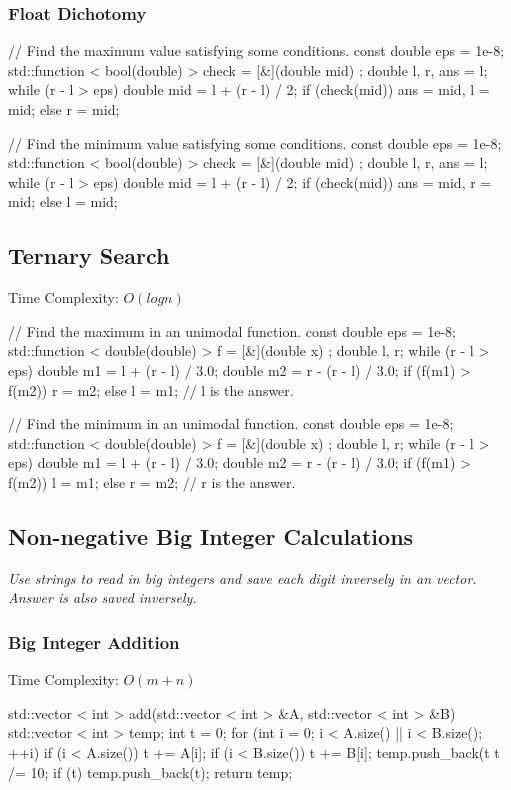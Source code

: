 \subsubsection{Float Dichotomy}
\begin{cppcode}
// Find the maximum value satisfying some conditions.
const double eps = 1e-8;
std::function < bool(double) > check = [&](double mid) {};
double l, r, ans = l;
while (r - l > eps)
{
    double mid = l + (r - l) / 2;
    if (check(mid)) ans = mid, l = mid;
    else r = mid;
}
\end{cppcode}
\begin{cppcode}
// Find the minimum value satisfying some conditions.
const double eps = 1e-8;
std::function < bool(double) > check = [&](double mid) {};
double l, r, ans = l;
while (r - l > eps)
{
    double mid = l + (r - l) / 2;
    if (check(mid)) ans = mid, r = mid;
    else l = mid;
}
\end{cppcode}

\subsection{Ternary Search}
Time Complexity: $O(logn)$
\begin{cppcode}
// Find the maximum in an unimodal function.
const double eps = 1e-8;
std::function < double(double) > f = [&](double x) {};
double l, r;
while (r - l > eps)
{
    double m1 = l + (r - l) / 3.0;
    double m2 = r - (r - l) / 3.0;
    if (f(m1) > f(m2)) r = m2;
    else l = m1; 
}
// l is the answer.
\end{cppcode}
\begin{cppcode}
// Find the minimum in an unimodal function.
const double eps = 1e-8;
std::function < double(double) > f = [&](double x) {};
double l, r;
while (r - l > eps)
{
    double m1 = l + (r - l) / 3.0;
    double m2 = r - (r - l) / 3.0;
    if (f(m1) > f(m2)) l = m1;
    else r = m2; 
}
// r is the answer.
\end{cppcode}

\subsection{Non-negative Big Integer Calculations}
\emph{Use strings to read in big integers and save each digit inversely in an vector.}
\emph{Answer is also saved inversely.}
\subsubsection{Big Integer Addition}
Time Complexity: $O(m + n)$
\begin{cppcode}
std::vector < int > add(std::vector < int > &A, std::vector < int > &B)
{
    std::vector < int > temp; int t = 0;
    for (int i = 0; i < A.size() || i < B.size(); ++i)
    {
        if (i < A.size()) t += A[i];
        if (i < B.size()) t += B[i];
        temp.push_back(t %
        t /= 10;
    }
    if (t) temp.push_back(t);
    return temp;
}
\end{cppcode}
